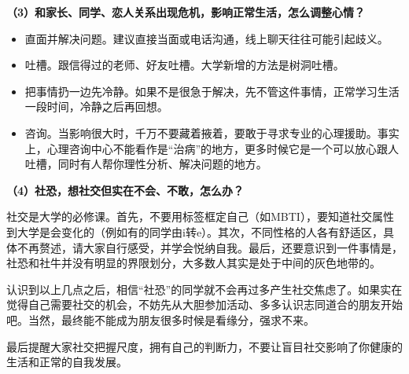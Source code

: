 \textbf{（3）和家长、同学、恋人关系出现危机，影响正常生活，怎么调整心情？}

\begin{itemize}
	\item 直面并解决问题。建议直接当面或电话沟通，线上聊天往往可能引起歧义。
	\item 吐槽。跟信得过的老师、好友吐槽。大学新增的方法是树洞吐槽。
	\item 把事情扔一边先冷静。如果不是很急于解决，先不管这件事情，正常学习生活一段时间，冷静之后再回想。
	\item 咨询。当影响很大时，千万不要藏着掖着，要敢于寻求专业的心理援助。事实上，心理咨询中心不能看作是“治病”的地方，更多时候它是一个可以放心跟人吐槽，同时有人帮你理性分析、解决问题的地方。
\end{itemize}

\textbf{（4）社恐，想社交但实在不会、不敢，怎么办？}

社交是大学的必修课。首先，不要用标签框定自己（如MBTI），要知道社交属性到大学是会变化的（例如有的同学由i转e）。其次，不同性格的人各有舒适区，具体不再赘述，请大家自行感受，并学会悦纳自我。最后，还要意识到一件事情是，社恐和社牛并没有明显的界限划分，大多数人其实是处于中间的灰色地带的。

\vspace{10pt}

认识到以上几点之后，相信“社恐”的同学就不会再过多产生社交焦虑了。如果实在觉得自己需要社交的机会，不妨先从大胆参加活动、多多认识志同道合的朋友开始吧。当然，最终能不能成为朋友很多时候是看缘分，强求不来。

\vspace{10pt}

最后提醒大家社交把握尺度，拥有自己的判断力，不要让盲目社交影响了你健康的生活和正常的自我发展。
